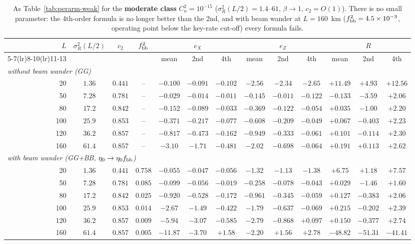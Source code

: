 \begin{table}[htbp]
\centering\scriptsize
\caption{As Table~\ref{tab:perarm-weak} for the \textbf{moderate class} $C_n^2=10^{-15}$ ($\sigma_R^2(L/2)=1.4$--$61$, $\beta\to1$, $c_2=O(1)$). There is no small parameter: the 4th-order formula is no longer better than the 2nd, and with beam wander at $L=160$~km ($f_{\rm bb}^2=4.5\times10^{-3}$, operating point below the key-rate cut-off) every formula fails.}
\label{tab:perarm-mod}
\begin{tabular}{rcccccccccccc}
\toprule
$L$ & $\sigma_R^2(L/2)$ & $c_2$ & $f_{\rm bb}^2$ & \multicolumn{3}{c}{$e_X$} & \multicolumn{3}{c}{$e_Z$} & \multicolumn{3}{c}{$R$}\\
\cmidrule(lr){5-7}\cmidrule(lr){8-10}\cmidrule(lr){11-13}
 & & & & mean & 2nd & 4th & mean & 2nd & 4th & mean & 2nd & 4th\\
\midrule
\multicolumn{13}{l}{\emph{without beam wander (GG)}} \\
20 & $1.36$ & $0.441$ & -- & $-0.100$ & $-0.091$ & $-0.102$ & $-2.56$ & $-2.34$ & $-2.65$ & $+11.49$ & $+4.93$ & $+12.56$ \\
50 & $7.28$ & $0.781$ & -- & $-0.029$ & $-0.014$ & $-0.011$ & $-0.145$ & $-0.011$ & $-0.122$ & $-0.133$ & $-3.59$ & $+2.06$ \\
80 & $17.2$ & $0.842$ & -- & $-0.152$ & $-0.089$ & $-0.033$ & $-0.369$ & $-0.122$ & $-0.054$ & $+0.035$ & $-1.00$ & $+2.20$ \\
100 & $25.9$ & $0.853$ & -- & $-0.371$ & $-0.217$ & $-0.077$ & $-0.608$ & $-0.209$ & $-0.049$ & $+0.067$ & $-0.403$ & $+2.23$ \\
120 & $36.2$ & $0.857$ & -- & $-0.817$ & $-0.473$ & $-0.162$ & $-0.949$ & $-0.333$ & $-0.061$ & $+0.101$ & $-0.114$ & $+2.30$ \\
160 & $61.4$ & $0.857$ & -- & $-3.10$ & $-1.71$ & $-0.481$ & $-2.02$ & $-0.698$ & $-0.064$ & $+0.191$ & $+0.113$ & $+2.62$ \\
\midrule
\multicolumn{13}{l}{\emph{with beam wander (GG+BB, $\eta_0\to\eta_0f_{\rm bb}$)}} \\
20 & $1.36$ & $0.441$ & $0.758$ & $-0.055$ & $-0.047$ & $-0.056$ & $-1.32$ & $-1.13$ & $-1.38$ & $+6.75$ & $+1.18$ & $+7.57$ \\
50 & $7.28$ & $0.781$ & $0.085$ & $-0.099$ & $-0.056$ & $-0.019$ & $-0.258$ & $-0.078$ & $-0.043$ & $+0.029$ & $-1.46$ & $+1.60$ \\
80 & $17.2$ & $0.842$ & $0.025$ & $-0.920$ & $-0.528$ & $-0.172$ & $-0.961$ & $-0.345$ & $-0.059$ & $+0.127$ & $-0.383$ & $+2.06$ \\
100 & $25.9$ & $0.853$ & $0.014$ & $-2.67$ & $-1.49$ & $-0.422$ & $-1.79$ & $-0.637$ & $-0.069$ & $+0.215$ & $-0.202$ & $+2.39$ \\
120 & $36.2$ & $0.857$ & $0.009$ & $-5.94$ & $-3.07$ & $-0.585$ & $-2.79$ & $-0.868$ & $+0.097$ & $+0.150$ & $-0.377$ & $+2.74$ \\
160 & $61.4$ & $0.857$ & $0.005$ & $-11.87$ & $-3.70$ & $+1.58$ & $-2.20$ & $+1.56$ & $+2.78$ & $-48.82$ & $-51.31$ & $-41.41$ \\


\end{tabular}
\end{table}
